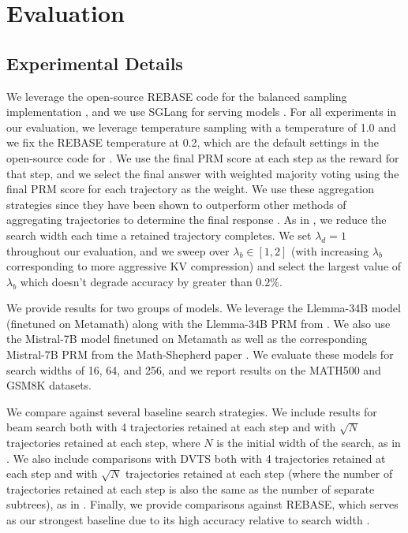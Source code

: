 \section{Evaluation}

\subsection{Experimental Details}

\label{sec:experimental-details}

We leverage the open-source REBASE code for the balanced sampling implementation \cite{wu2024inference}, and we use SGLang for serving models \cite{zheng2023efficiently}.
For all experiments in our evaluation, we leverage temperature sampling with a temperature of 1.0 and we fix the REBASE temperature at 0.2, which are the default settings in the open-source code for \cite{wu2024inference}.
We use the final PRM score at each step as the reward for that step, and we select the final answer with weighted majority voting using the final PRM score for each trajectory as the weight.
We use these aggregation strategies since they have been shown to outperform other methods of aggregating trajectories to determine the final response \cite{beeching2024scalingtesttimecompute}.
As in \cite{wu2024inference}, we reduce the search width each time a retained trajectory completes.
We set $\lambda_d = 1$ throughout our evaluation, and we sweep over $\lambda_b \in [1,2]$ (with increasing $\lambda_b$ corresponding to more aggressive KV compression) and select the largest value of $\lambda_b$ which doesn't degrade accuracy by greater than $0.2\%$.

We provide results for two groups of models. We leverage the Llemma-34B model (finetuned on Metamath) along with the Llemma-34B PRM from \cite{wu2024inference}.
We also use the Mistral-7B model finetuned on Metamath as well as the corresponding Mistral-7B PRM from the Math-Shepherd paper \cite{wang2024math}.
We evaluate these models for search widths of 16, 64, and 256, and we report results on the MATH500 and GSM8K \cite{cobbe2021training} datasets.

We compare against several baseline search strategies.
We include results for beam search both with 4 trajectories retained at each step and with  $\sqrt{N}$ trajectories retained at each step, where $N$ is the initial width of the search, as in \cite{snell2024scaling}.
We also include comparisons with DVTS both with 4 trajectories retained at each step and with $\sqrt{N}$ trajectories retained at each step (where the number of trajectories retained at each step is also the same as the number of separate subtrees), as in \cite{beeching2024scalingtesttimecompute}.
Finally, we provide comparisons against REBASE, which serves as our strongest baseline due to its high accuracy relative to search width \cite{wu2024inference}.



